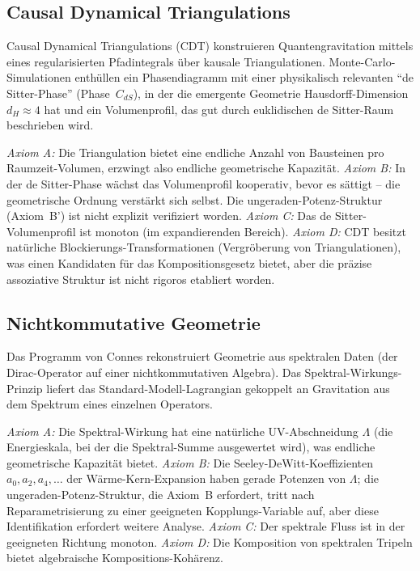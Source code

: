 \documentclass[aps,prd,twocolumn,superscriptaddress,nofootinbib]{revtex4-2}
\begin{document}
\subsection{Causal Dynamical Triangulations}

Causal Dynamical Triangulations (CDT) \cite{Ambjorn2005,Loll2020} konstruieren Quantengravitation mittels eines regularisierten Pfadintegrals über kausale Triangulationen. Monte-Carlo-Simulationen enthüllen ein Phasendiagramm mit einer physikalisch relevanten ``de Sitter-Phase'' (Phase~$C_{dS}$), in der die emergente Geometrie Hausdorff-Dimension $d_H \approx 4$ hat und ein Volumenprofil, das gut durch euklidischen de Sitter-Raum beschrieben wird.

\textit{Axiom A:} Die Triangulation bietet eine endliche Anzahl von Bausteinen pro Raumzeit-Volumen, erzwingt also endliche geometrische Kapazität. \textit{Axiom B:} In der de Sitter-Phase wächst das Volumenprofil kooperativ, bevor es sättigt -- die geometrische Ordnung verstärkt sich selbst. Die ungeraden-Potenz-Struktur (Axiom~B') ist nicht explizit verifiziert worden. \textit{Axiom C:} Das de Sitter-Volumenprofil ist monoton (im expandierenden Bereich). \textit{Axiom D:} CDT besitzt natürliche Blockierungs-Transformationen (Vergröberung von Triangulationen), was einen Kandidaten für das Kompositionsgesetz bietet, aber die präzise assoziative Struktur ist nicht rigoros etabliert worden.

\subsection{Nichtkommutative Geometrie}

Das Programm von Connes \cite{Connes1994} rekonstruiert Geometrie aus spektralen Daten (der Dirac-Operator auf einer nichtkommutativen Algebra). Das Spektral-Wirkungs-Prinzip liefert das Standard-Modell-Lagrangian gekoppelt an Gravitation aus dem Spektrum eines einzelnen Operators.

\textit{Axiom A:} Die Spektral-Wirkung hat eine natürliche UV-Abschneidung $\Lambda$ (die Energieskala, bei der die Spektral-Summe ausgewertet wird), was endliche geometrische Kapazität bietet. \textit{Axiom B:} Die Seeley-DeWitt-Koeffizienten $a_0, a_2, a_4, \ldots$ der Wärme-Kern-Expansion haben gerade Potenzen von $\Lambda$; die ungeraden-Potenz-Struktur, die Axiom~B erfordert, tritt nach Reparametrisierung zu einer geeigneten Kopplungs-Variable auf, aber diese Identifikation erfordert weitere Analyse. \textit{Axiom C:} Der spektrale Fluss ist in der geeigneten Richtung monoton. \textit{Axiom D:} Die Komposition von spektralen Tripeln bietet algebraische Kompositions-Kohärenz.
\end{document}
